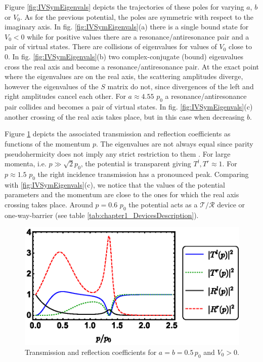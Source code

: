 Figure \ref{fig:IVSymEigenvals} depicts the trajectories of these poles for varying $a$, $b$ or $V_0$. As for the previous potential, the poles are symmetric with respect to the imaginary axis. In fig. \ref{fig:IVSymEigenvals}(a) there is a single bound state for $V_0<0$ while for positive values there are a resonance/antiresonance pair and a pair of virtual states. There are collisions of eigenvalues for values of $V_0$ close to 0. In fig. \ref{fig:IVSymEigenvals}(b)  two complex-conjugate (bound) eigenvalues cross the real axis and become a resonance/antiresonance pair. At the exact point where the eigenvalues are on the real axis, the scattering amplitudes diverge, however the eigenvalues of the $S$ matrix do not, since divergences of the left and right amplitudes cancel each other. For $a  \approx 4.55$ $p_0$ a resonance/antiresonance pair collides and becomes a pair of virtual states. In fig. \ref{fig:IVSymEigenvals}(c) another crossing of the real axis takes place, but in this case when decreasing $b$.

Figure \ref{fig:T_R_fig2} depicts the associated transmission and reflection coefficients as functions of the momentum $p$. The eigenvalues are not always equal since parity pseudohermicity does not imply any strict restriction to them \cite{Ruschhaupt2017}. For large  momenta, i.e. $p \gg \sqrt{2} p_0$, the potential is transparent giving $T^l,T^r \approx 1$. For $p\approx 1.5$ $p_0$ the right incidence transmission has a pronounced peak. Comparing with \ref{fig:IVSymEigenvals}(c), we notice that the values of the potential parameters and the momentum are close to the ones for which the real axis crossing takes place. Around $p = 0.6$ $p_0$ the potential acts as a $\mathcal{T}/\mathcal{R}$ device or one-way-barrier (see table \ref{tab:chapter1_DevicesDescription}).


\begin{figure}[t]
\begin{center}
  \includegraphics[width=0.75\linewidth]{Figures/IVSymTR.eps}
\end{center}
\caption{ Transmission and reflection coefficients for $a=b=0.5\, p_0$ and $V_0>0$.}
\label{fig:T_R_fig2}
\end{figure}


